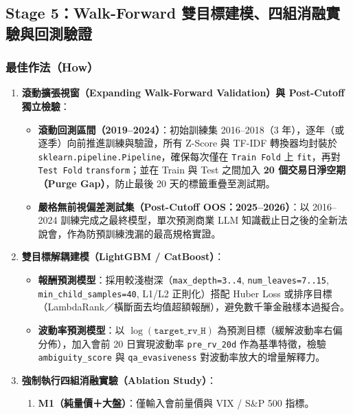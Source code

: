 \documentclass[11pt, a4paper]{article}
\begin{document}
\subsection{Stage 5：Walk-Forward 雙目標建模、四組消融實驗與回測驗證}

\subsubsection{最佳作法（How）}
\begin{enumerate}[leftmargin=1.5em, itemsep=2pt]
    \item \textbf{滾動擴張視窗（Expanding Walk-Forward Validation）與 Post-Cutoff 獨立檢驗}：
    \begin{itemize}[leftmargin=1.2em]
        \item \textbf{滾動回測區間（2019--2024）}：初始訓練集 2016--2018（3 年），逐年（或逐季）向前推進訓練與驗證，所有 Z-Score 與 TF-IDF 轉換器均封裝於 \texttt{sklearn.pipeline.Pipeline}，確保每次僅在 \texttt{Train Fold} 上 \texttt{fit}，再對 \texttt{Test Fold} \texttt{transform}；並在 Train 與 Test 之間加入 \textbf{20 個交易日淨空期（Purge Gap）}，防止最後 20 天的標籤重疊至測試期。
        \item \textbf{嚴格無前視偏差測試集（Post-Cutoff OOS：2025--2026）}：以 2016--2024 訓練完成之最終模型，單次預測商業 LLM 知識截止日之後的全新法說會，作為防預訓練洩漏的最高規格實證。
    \end{itemize}
    \item \textbf{雙目標解耦建模（LightGBM / CatBoost）}：
    \begin{itemize}[leftmargin=1.2em]
        \item \textbf{報酬預測模型}：採用較淺樹深（\texttt{max\_depth=3..4}, \texttt{num\_leaves=7..15}, \texttt{min\_child\_samples=40}, L1/L2 正則化）搭配 Huber Loss 或排序目標（LambdaRank／橫斷面去均值超額報酬），避免數千筆金融樣本過擬合。
        \item \textbf{波動率預測模型}：以 $\log(\texttt{target\_rv\_H})$ 為預測目標（緩解波動率右偏分佈），加入會前 20 日實現波動率 \texttt{pre\_rv\_20d} 作為基準特徵，檢驗 \texttt{ambiguity\_score} 與 \texttt{qa\_evasiveness} 對波動率放大的增量解釋力。
    \end{itemize}
    \item \textbf{強制執行四組消融實驗（Ablation Study）}：
    \begin{enumerate}[leftmargin=1.4em, itemsep=1pt]
        \item \textbf{M1（純量價＋大盤）}：僅輸入會前量價與 VIX / S\&P 500 指標。

\end{enumerate}
\end{enumerate}
\end{document}
